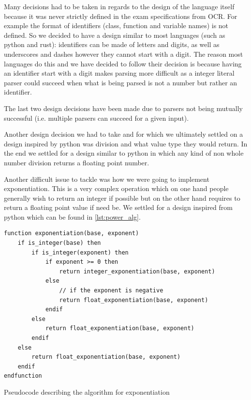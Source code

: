 \documentclass{article}
\begin{document}
Many decisions had to be taken in regards to the design of the language itself
because it was never strictly defined in the exam specifications from OCR. For
example the format of identifiers (class, function and variable names) is not
defined. So we decided to have a design similar to most languages (such as
python and rust): identifiers can be made of letters and digits, as well as
underscores and dashes however they cannot start with a digit. The reason most
languages do this and we have decided to follow their decision is because
having an identifier start with a digit makes parsing more difficult as a
integer literal parser could succeed when what is being parsed is not a number
but rather an identifier.

The last two design decisions have been made due to parsers not being mutually
successful (i.e. multiple parsers can succeed for a given input).

Another design decision we had to take and for which we ultimately settled on a
design inspired by python was division and what value type they would return.
In the end we settled for a design similar to python in which any kind of non
whole number division returns a floating point number.

Another difficult issue to tackle was how we were going to implement
exponentiation. This is a very complex operation which on one hand people
generally wish to return an integer if possible but on the other hand requires
to return a floating point value if need be. We settled for a design inspired
from python which can be found in \autoref{lst:power_alg}.

\begin{listing}
	\begin{verbatim}
function exponentiation(base, exponent)
	if is_integer(base) then
		if is_integer(exponent) then
			if exponent >= 0 then
				return integer_exponentiation(base, exponent)
			else
				// if the exponent is negative
				return float_exponentiation(base, exponent)
			endif
		else
			return float_exponentiation(base, exponent)
		endif
	else
		return float_exponentiation(base, exponent)
	endif
endfunction
	\end{verbatim}
	\caption[Pseudocode describing the algorithm for exponentiation]{Pseudocode
	describing the algorithm for exponentiation\protect\footnotemark}
	\label{lst:power_alg}
\end{listing}

\end{document}
